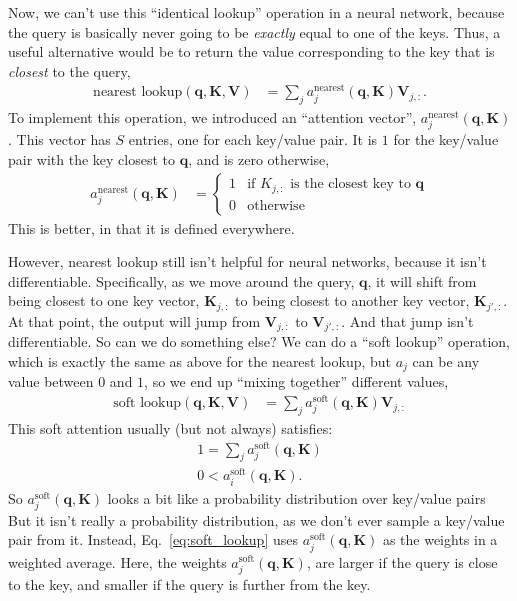 \documentclass{article}
\begin{document}
Now, we can't use this ``identical lookup'' operation in a neural network, because the query is basically never going to be \textit{exactly} equal to one of the keys.
Thus, a useful alternative would be to return the value corresponding to the key that is \textit{closest} to the query,
\begin{align}
  \text{nearest lookup}(\mathbf{q}, \mathbf{K}, \mathbf{V}) &= \sum_j a^\text{nearest}_j(\mathbf{q}, \mathbf{K})\mathbf{V}_{j, :}.
\end{align}
To implement this operation, we introduced an ``attention vector'', $a^\text{nearest}_j(\mathbf{q}, \mathbf{K})$.
This vector has $S$ entries, one for each key/value pair.
It is $1$ for the key/value pair with the key closest to $\mathbf{q}$, and is zero otherwise,
\begin{align}
  a^\text{nearest}_j(\mathbf{q}, \mathbf{K}) &= \begin{cases}
    1 & \text{if $K_{j, :}$ is the closest key to $\mathbf{q}$}\\
    0 & \text{otherwise}
  \end{cases}
\end{align}
This is better, in that it is defined everywhere.

However, nearest lookup still isn't helpful for neural networks, because it isn't differentiable.
Specifically, as we move around the query, $\mathbf{q}$, it will shift from being closest to one key vector, $\mathbf{K}_{j, :}$ to being closest to another key vector, $\mathbf{K}_{j', :}$.
At that point, the output will jump from $\mathbf{V}_{j, :}$ to $\mathbf{V}_{j', :}$.
And that jump isn't differentiable.
So can we do something else?
We can do a ``soft lookup'' operation, which is exactly the same as above for the nearest lookup, but $a_j$ can be any value between $0$ and $1$, so we end up ``mixing together'' different values,
\begin{align}
  \label{eq:soft_lookup}
  \text{soft lookup}(\mathbf{q}, \mathbf{K}, \mathbf{V}) &= \sum_j a^\text{soft}_j(\mathbf{q}, \mathbf{K})\mathbf{V}_{j, :}
\end{align}
This soft attention usually (but not always) satisfies:
\begin{subequations}
\label{eq:att_as_prob}
\begin{align}
  1 = \sum_j a^\text{soft}_j(\mathbf{q}, \mathbf{K})\\
  0 < a^\text{soft}_i(\mathbf{q}, \mathbf{K}).
\end{align}
\end{subequations}
So $a^\text{soft}_j(\mathbf{q}, \mathbf{K})$ looks a bit like a probability distribution over key/value pairs
But it isn't really a probability distribution, as we don't ever sample a key/value pair from it.
Instead, Eq.~\eqref{eq:soft_lookup} uses $a^\text{soft}_j(\mathbf{q}, \mathbf{K})$ as the weights in a weighted average.
Here, the weights $a^\text{soft}_j(\mathbf{q}, \mathbf{K})$, are larger if the query is close to the key, and smaller if the query is further from the key.
\end{document}
